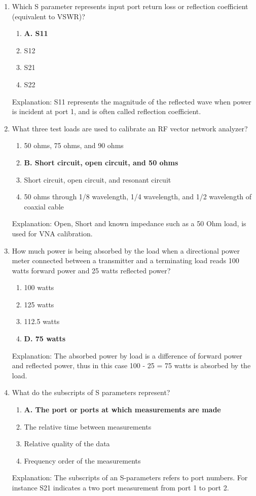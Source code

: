 \begin{enumerate}
    \item Which S parameter represents input port return loss or reflection coefficient (equivalent to VSWR)?
      \begin{enumerate}
        \item \textbf{A. S11}
         \item  S12
        \item  S21
        \item  S22
    \end{enumerate}
        \textcolor{myred}{Explanation:}
     S11 represents the magnitude of the reflected wave when power is incident at port 1, and is often called reflection coefficient.

     \item What three test loads are used to calibrate an RF vector network analyzer?
    \begin{enumerate}
        \item  50 ohms, 75 ohms, and 90 ohms
    \item \textbf{B. Short circuit, open circuit, and 50 ohms}
        \item  Short circuit, open circuit, and resonant circuit
         \item  50 ohms through 1/8 wavelength, 1/4 wavelength, and 1/2 wavelength of coaxial cable
        \end{enumerate}
        \textcolor{myred}{Explanation:}
      Open, Short and known impedance such as a 50 Ohm load, is used for VNA calibration.

     \item How much power is being absorbed by the load when a directional power meter connected between a transmitter and a terminating load reads 100 watts forward power and 25 watts reflected power?
        \begin{enumerate}
        \item  100 watts
       \item  125 watts
      \item  112.5 watts
      \item \textbf{D. 75 watts}
        \end{enumerate}
      \textcolor{myred}{Explanation:}
       The absorbed power by load is a difference of forward power and reflected power, thus in this case 100 - 25 = 75 watts is absorbed by the load.
        
       \item What do the subscripts of S parameters represent?
       \begin{enumerate}
       \item \textbf{A. The port or ports at which measurements are made}
        \item  The relative time between measurements
       \item  Relative quality of the data
        \item  Frequency order of the measurements
      \end{enumerate}
       \textcolor{myred}{Explanation:}
       The subscripts of an S-parameters refers to port numbers. For instance S21 indicates a two port measurement from port 1 to port 2.
        

\end{enumerate}
